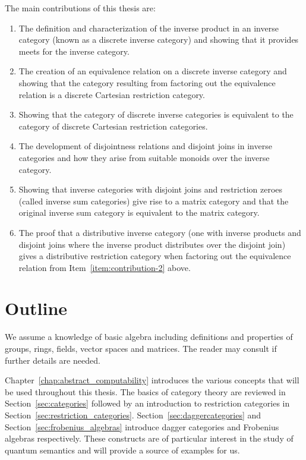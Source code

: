 The main contributions of this thesis are:
\begin{enumerate}
\item The definition and characterization of the inverse product in an inverse category (known as a
  discrete inverse category) and showing  that it provides meets for the inverse category.
\item The creation of an equivalence relation on a discrete inverse category and showing that the
  category resulting from factoring out the equivalence relation is a discrete Cartesian restriction
  category.\label{item:contribution-2}
\item Showing that the category of discrete inverse categories is equivalent to the category of
  discrete Cartesian restriction categories.
\item The development of disjointness relations and disjoint joins in inverse categories and how
  they arise from suitable monoids over the inverse category.
\item Showing that inverse categories with disjoint joins and restriction zeroes (called inverse sum
  categories) give rise to a matrix category and that the original inverse sum category is
  equivalent to the matrix category.
\item The proof that a distributive inverse category (one with inverse products and disjoint joins
  where the inverse product distributes over the disjoint join) gives a distributive restriction
  category when factoring out the equivalence relation from Item~\ref{item:contribution-2} above.
\end{enumerate}

\section{Outline} %
\label{sec:outline}

We assume a knowledge of basic algebra including definitions and properties of groups, rings,
fields, vector spaces and matrices. The reader may consult \cite{lang:algebra} if further details
are needed.

Chapter~\ref{chap:abstract_computability} introduces the various concepts that will be used
throughout this thesis. The basics of category theory are reviewed in Section~\ref{sec:categories}
followed by an introduction to restriction categories in
Section~\ref{sec:restriction_categories}. Section~\ref{sec:daggercategories} and
Section~\ref{sec:frobenius_algebras}  introduce dagger categories and Frobenius
algebras respectively. These constructs are of particular interest in the study of quantum semantics
and will provide a source of examples for us.

